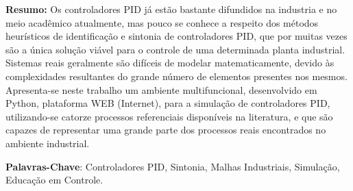 \begin{resumo}

    \textbf{Resumo:} Os controladores \acs{PID} já estão bastante difundidos na industria e no
    meio acadêmico atualmente, mas pouco se conhece a respeito dos métodos
    heurísticos de identificação e sintonia de controladores \acs{PID},
    que por muitas vezes são a única solução viável para o controle de
    uma determinada planta industrial. Sistemas reais geralmente são difíceis
    de modelar matematicamente, devido às complexidades resultantes do
    grande número de elementos presentes nos mesmos. Apresenta-se
    neste trabalho um ambiente multifuncional, desenvolvido em Python,
    plataforma WEB (Internet), para a simulação de controladores \acs{PID},
    utilizando-se catorze processos referenciais disponíveis na literatura, e
    que são capazes de representar uma grande parte dos processos reais
    encontrados no ambiente industrial.
    
    \textbf{Palavras-Chave}: Controladores PID, Sintonia, Malhas Industriais,
    Simulação, Educação em Controle.

\end{resumo}
